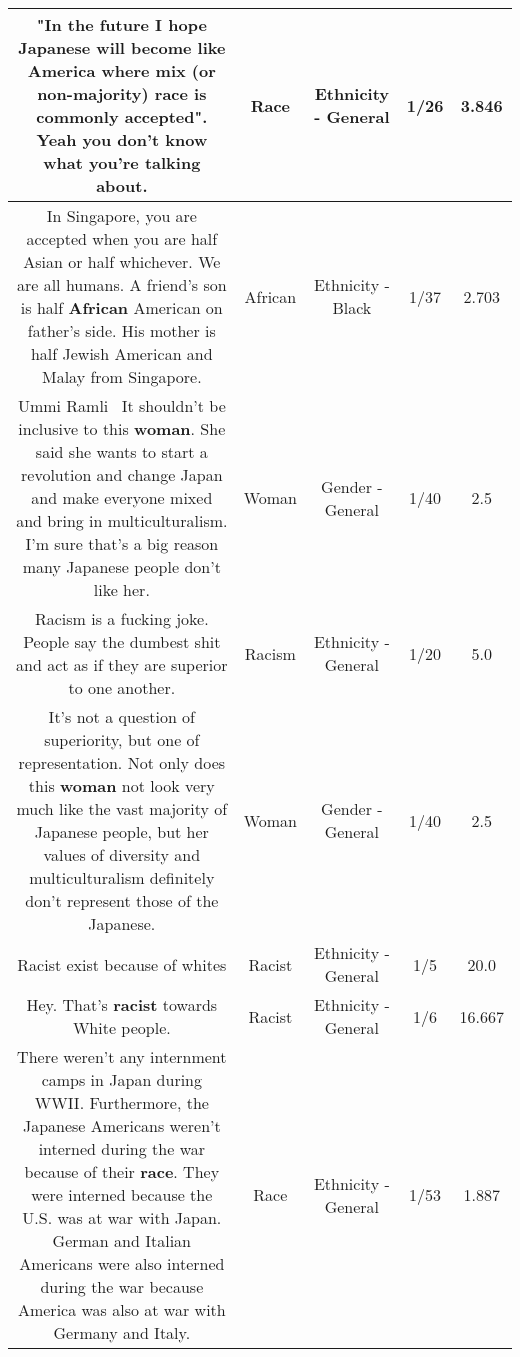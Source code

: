 \documentclass[11pt]{article}
\newlength\mylength
\begin{document}
\begin{center}
\begin{longtable}{|C{.65\mylength}|C{.30\mylength}|C{.12\mylength}|C{.12\mylength}|C{.12\mylength}|}
  \small "In the future I hope Japanese will become like America where mix (or non-majority) \textbf{race} is commonly accepted". Yeah you don't know what you're talking about.\normalsize   & Race & Ethnicity - General & 1/26 & 3.846 \\  \hline
  \small In Singapore, you are accepted when you are half Asian or half whichever. We are all humans. A friend's son is half \textbf{African} American on father's side. His mother is half Jewish American and Malay from Singapore.\normalsize   & African & Ethnicity - Black & 1/37 & 2.703 \\  \hline
  \small Ummi Ramli  It shouldn't be inclusive to this \textbf{woman}. She said she wants to start a revolution and change Japan and make everyone mixed and bring in multiculturalism. I'm sure that's a big reason many Japanese people don't like her.\normalsize   & Woman & Gender - General & 1/40 & 2.5 \\  \hline
  \small Racism is a fucking joke. People say the dumbest shit and act as if they are superior to one another.\normalsize   & Racism & Ethnicity - General & 1/20 & 5.0 \\  \hline
  \small It's not a question of superiority, but one of representation. Not only does this \textbf{woman} not look very much like the vast majority of Japanese people, but her values of diversity and multiculturalism definitely don't represent those of the Japanese.\normalsize   & Woman & Gender - General & 1/40 & 2.5 \\  \hline
  \small Racist exist because of whites\normalsize   & Racist & Ethnicity - General & 1/5 & 20.0 \\  \hline
  \small Hey. That's \textbf{racist} towards White people.\normalsize   & Racist & Ethnicity - General & 1/6 & 16.667 \\  \hline
  \small There weren't any internment camps in Japan during WWII. Furthermore, the Japanese Americans weren't interned during the war because of their \textbf{race}. They were interned because the U.S. was at war with Japan. German and Italian Americans were also interned during the war because America was also at war with Germany and Italy.\normalsize   & Race & Ethnicity - General & 1/53 & 1.887 \\  \hline

\end{longtable}
\end{center}
\end{document}
